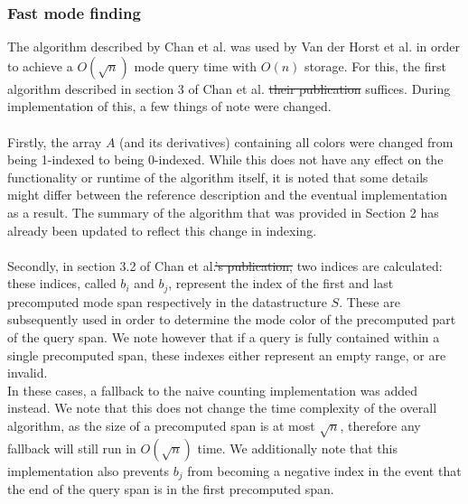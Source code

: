 \documentclass{article}
\newcommand{\fbrm}[1]{{\color{blue}\st{#1}}}
\begin{document}
\subsubsection{Fast mode finding}
The algorithm described by Chan et al. \cite{Chan2014} was used by Van der
Horst et al. in order to achieve a $O(\sqrt{n})$ mode query time with $O(n)$
storage. For this, the first algorithm described in section 3 of Chan et al.
\fbrm{their publication} suffices. During implementation of this, a few things of note
were changed.\\\\ Firstly, the array $A$ (and its derivatives) containing all
colors were changed from being 1-indexed to being 0-indexed. While this does
not have any effect on the functionality or runtime of the algorithm itself, it
is noted that some details might differ between the reference description and
the eventual implementation as a result. The summary of the algorithm that was
provided in Section 2 has already been updated to reflect this change in
indexing.\\\\ Secondly, in section 3.2 of Chan et al.\fbrm{'s publication,} two
indices are calculated: these indices, called $b_i$ and $b_j$, represent the
index of the first and last precomputed mode span respectively in the
datastructure $S$. These are subsequently used in order to determine the mode
color of the precomputed part of the query span. We note however that if a
query is fully contained within a single precomputed span, these indexes either
represent an empty range, or are invalid. \\ In these cases, a fallback to the
naive counting implementation was added instead. We note that this does not
change the time complexity of the overall algorithm, as the size of a
precomputed span is at most $\sqrt{n}$, therefore any fallback will still run
in $O(\sqrt{n})$ time. We additionally note that this implementation also
prevents $b_j$ from becoming a negative index in the event that the end of the
query span is in the first precomputed span.
\end{document}
